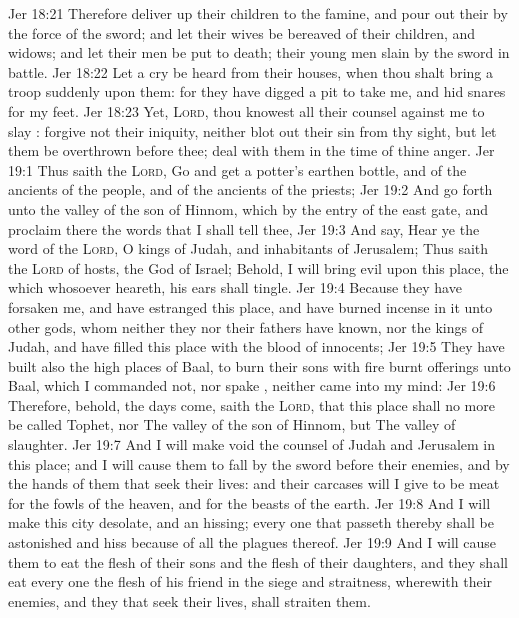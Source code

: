 \vs Jer 18:21 Therefore deliver up their children to the famine, and pour out their  by the force of the sword; and let their wives be bereaved of their children, and  widows; and let their men be put to death;  their young men  slain by the sword in battle.
\vs Jer 18:22 Let a cry be heard from their houses, when thou shalt bring a troop suddenly upon them: for they have digged a pit to take me, and hid snares for my feet.
\vs Jer 18:23 Yet, \textsc{Lord}, thou knowest all their counsel against me to slay : forgive not their iniquity, neither blot out their sin from thy sight, but let them be overthrown before thee; deal  with them in the time of thine anger.
\vs Jer 19:1 Thus saith the \textsc{Lord}, Go and get a potter's earthen bottle, and  of the ancients of the people, and of the ancients of the priests;
\vs Jer 19:2 And go forth unto the valley of the son of Hinnom, which  by the entry of the east gate, and proclaim there the words that I shall tell thee,
\vs Jer 19:3 And say, Hear ye the word of the \textsc{Lord}, O kings of Judah, and inhabitants of Jerusalem; Thus saith the \textsc{Lord} of hosts, the God of Israel; Behold, I will bring evil upon this place, the which whosoever heareth, his ears shall tingle.
\vs Jer 19:4 Because they have forsaken me, and have estranged this place, and have burned incense in it unto other gods, whom neither they nor their fathers have known, nor the kings of Judah, and have filled this place with the blood of innocents;
\vs Jer 19:5 They have built also the high places of Baal, to burn their sons with fire  burnt offerings unto Baal, which I commanded not, nor spake , neither came  into my mind:
\vs Jer 19:6 Therefore, behold, the days come, saith the \textsc{Lord}, that this place shall no more be called Tophet, nor The valley of the son of Hinnom, but The valley of slaughter.
\vs Jer 19:7 And I will make void the counsel of Judah and Jerusalem in this place; and I will cause them to fall by the sword before their enemies, and by the hands of them that seek their lives: and their carcases will I give to be meat for the fowls of the heaven, and for the beasts of the earth.
\vs Jer 19:8 And I will make this city desolate, and an hissing; every one that passeth thereby shall be astonished and hiss because of all the plagues thereof.
\vs Jer 19:9 And I will cause them to eat the flesh of their sons and the flesh of their daughters, and they shall eat every one the flesh of his friend in the siege and straitness, wherewith their enemies, and they that seek their lives, shall straiten them.
